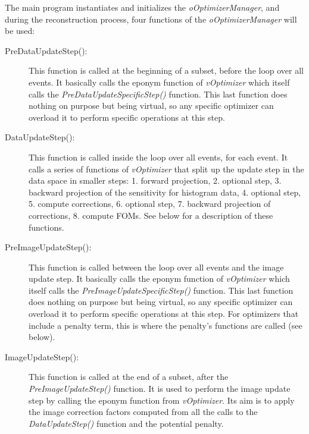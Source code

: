 \documentclass[a4paper, 11pt]{article}
\begin{document}
The main program instantiates and initializes the \textit{oOptimizerManager}, and during the reconstruction process, four functions of the \textit{oOptimizerManager} will be used:
\begin{description}
  \item[PreDataUpdateStep():]
This function is called at the beginning of a subset, before the loop over all events.
It basically calls the eponym function of \textit{vOptimizer} which itself calls the \textit{PreDataUpdateSpecificStep()} function.
This last function does nothing on purpose but being virtual, so any specific optimizer can overload it to perform specific operations at this step.
  \item[DataUpdateStep():]
This function is called inside the loop over all events, for each event.
It calls a series of functions of \textit{vOptimizer} that split up the update step in the data space in smaller steps:
1. forward projection, 2. optional step, 3. backward projection of the sensitivity for histogram data, 4. optional step, 5. compute corrections, 6. optional step, 7. backward projection of corrections, 8. compute FOMs.
See below for a description of these functions.
  \item[PreImageUpdateStep():]
This function is called between the loop over all events and the image update step.
It basically calls the eponym function of \textit{vOptimizer} which itself calls the \textit{PreImageUpdateSpecificStep()} function.
This last function does nothing on purpose but being virtual, so any specific optimizer can overload it to perform specific operations at this step.
For optimizers that include a penalty term, this is where the penalty's functions are called (see below).
  \item[ImageUpdateStep():]
This function is called at the end of a subset, after the \textit{PreImageUpdateStep()} function.
It is used to perform the image update step by calling the eponym function from \textit{vOptimizer}.
Its aim is to apply the image correction factors computed from all the calls to the \textit{DataUpdateStep()} function and the potential penalty.
\end{description}

\bigskip
\end{document}
